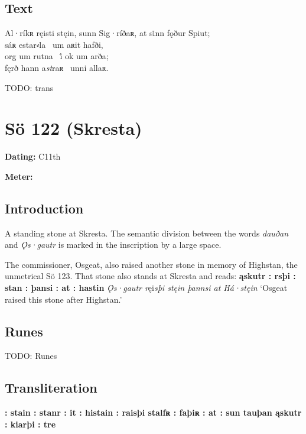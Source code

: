 \subsection{Text}

\bpg\bpa[0]%
\startsub Al·ríkʀ ręisti stęin, sunn Sig·ríðaʀ, at si̇nn fǫður Spiut;\endsub \\
sáʀ estar⸗la \hld\ um aʀit hafði, \\
org um rutna \hld\ i̇́ ok um arða; \\
fęrð hann a\emph{st}raʀ \hld\ unni allaʀ.\epa

\bpb TODO: trans\epb\epg

\sectionline\clearpage


\section{Sö 122 (Skresta)}

\begin{flushright}%
\textbf{Dating:} C11th

\textbf{Meter:} \Fornyrdislag
\end{flushright}%

\subsection{Introduction}

A standing stone at Skresta.  The semantic division between the words \emph{dauðan} and \emph{Ǫ̇s·gautr} is marked in the inscription by a large space.

The commissioner, Osgeat, also raised another stone in memory of Highstan, the unmetrical Sö 123.  That stone also stands at Skresta and reads: \textbf{ąskutr : rsþi : stan : þansi : at : hastin} \emph{Ǫ̇s·gautr r}ęi\emph{sþi stęin þannsi at Há·stęin} ‘Osgeat raised this stone after Highstan.’

\subsection{Runes}

TODO: Runes%

\subsection{Transliteration}

\textbf{: stain : stanr : it : histain : raisþi stalfʀ : faþiʀ : at : sun tauþan ąskutr : kiarþi : tre}

